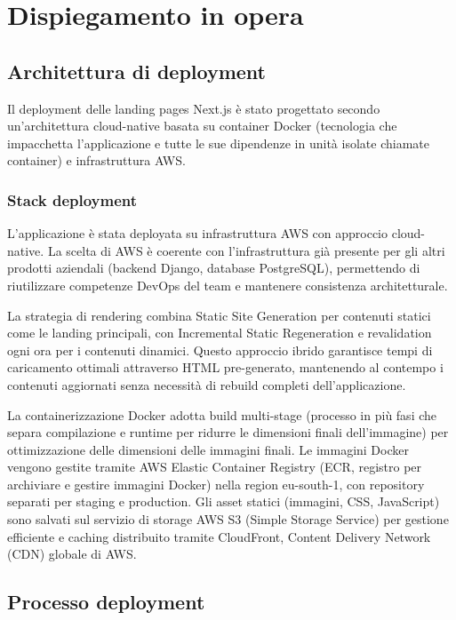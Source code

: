 \chapter{Dispiegamento in opera}

\section{Architettura di deployment}

Il deployment delle landing pages Next.js è stato progettato secondo 
un'architettura cloud-native basata su container Docker (tecnologia che 
impacchetta l'applicazione e tutte le sue dipendenze in unità isolate 
chiamate container) e infrastruttura AWS.

\subsection{Stack deployment}

L'applicazione è stata deployata su infrastruttura AWS con approccio cloud-native. 
La scelta di AWS è coerente con l'infrastruttura già presente per gli altri 
prodotti aziendali (backend Django, database PostgreSQL), permettendo di 
riutilizzare competenze DevOps del team e mantenere consistenza architetturale.

La strategia di rendering combina Static Site Generation per contenuti statici 
come le landing principali, con Incremental Static Regeneration e revalidation 
ogni ora per i contenuti dinamici. Questo approccio ibrido garantisce tempi di 
caricamento ottimali attraverso HTML pre-generato, mantenendo al contempo i 
contenuti aggiornati senza necessità di rebuild completi dell'applicazione.

La containerizzazione Docker adotta build multi-stage (processo in più fasi 
che separa compilazione e runtime per ridurre le dimensioni finali dell'immagine) 
per ottimizzazione delle dimensioni delle immagini finali. Le immagini Docker 
vengono gestite tramite AWS Elastic Container Registry (ECR, registro per 
archiviare e gestire immagini Docker) nella region eu-south-1, con repository 
separati per staging e production. Gli asset statici (immagini, CSS, JavaScript) 
sono salvati sul servizio di storage AWS S3 (Simple Storage Service) per 
gestione efficiente e caching distribuito tramite CloudFront, Content Delivery 
Network (CDN) globale di AWS.

\section{Processo deployment}

